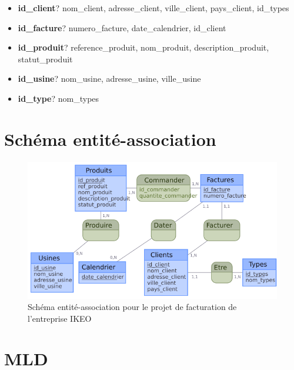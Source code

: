 \documentclass[french]{article}
\begin{document}
\begin{itemize}
    \item \textbf{id\_client}? nom\_client, adresse\_client, ville\_client, pays\_client, id\_types
    \item \textbf{id\_facture}? numero\_facture, date\_calendrier, id\_client
    \item \textbf{id\_produit}? reference\_produit, nom\_produit, description\_produit, statut\_produit
    \item \textbf{id\_usine}? nom\_usine, adresse\_usine, ville\_usine
    \item \textbf{id\_type}? nom\_types
\end{itemize}

\section{Schéma entité-association}

\begin{figure}[!htbp]
    \centering
    \includegraphics[width=\textwidth]{Rapport/Image/schema_EA.png}
    \caption{Schéma entité-association pour le projet de facturation de l'entreprise IKEO}
    \label{fig:schema_EA}
\end{figure}
    
\section{MLD}
\end{document}
